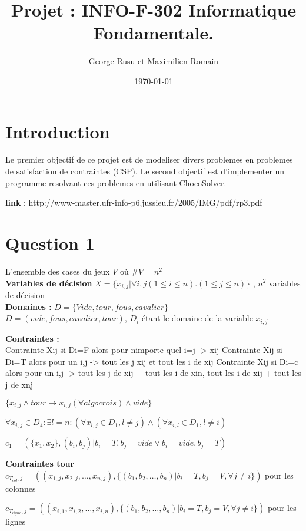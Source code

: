 \documentclass[a4paper,10pt]{article}
\title{Projet : INFO-F-302 Informatique Fondamentale.}
\author{George Rusu et Maximilien Romain}
\date{\today}
\begin{document}
\maketitle
\tableofcontents
\newpage
\section{Introduction}
Le premier objectif de ce projet est de modeliser divers problemes en problemes de satisfaction de contraintes (CSP). Le second objectif est d’implementer un programme resolvant ces problemes en utilisant ChocoSolver.

\textbf{link} :  http://www-master.ufr-info-p6.jussieu.fr/2005/IMG/pdf/rp3.pdf

\section{Question 1}
L'ensemble des cases du jeux $V$ où $ \#V = n^2$ \\
\textbf {Variables de décision} $ X = \{x_{i,j} | \forall i,j (1 \leq i \leq n).(1 \leq j \leq n)\}$ , $n^2$ variables de décision \\
\textbf{Domaines : }
$ D = \{Vide, tour, fous, cavalier \} $ \\
$ D = (vide, fous, cavalier, tour) $, $D_i$ étant le domaine de la variable $x_{i,j}$

\textbf{Contraintes : }\\
Contrainte{ Xij si Di=F alors {pour nimporte quel i=j -> xij}}
Contrainte{ Xij si Di=T alors {pour un i,j -> tout les j xij et tout les i de xij}}
Contrainte{ Xij si Di=c alors {pour un i,j -> tout les j de xij + tout les i de xin, tout les i de xij + tout les j de xnj}}

$ \{ x_{i,j} \wedge tour \rightarrow x_{i,j} (\forall algo crois) \wedge vide \} $

$\forall x_{i,j} \in D_4 : \exists l=n : (\forall x_{l,j} \in D_1, l \neq j) \wedge (\forall x_{i,l} \in D_1, l \neq i)$

$ c_1 = (\{x_1, x_2\},(b_i, b_j)| b_i = T, b_j = vide \lor b_i = vide, b_j = T) $

\textbf{Contraintes tour}\\
$ c_{T_{col},j} = ((x_{1,j}, x_{2,j},\ldots, x_{n,j}), \{(b_1, b_2,\ldots, b_n) | b_i = T, b_j = V, \forall j \ne i\})$ pour les colonnes

$ c_{T_{ligne},j} = ((x_{i,1}, x_{i,2},\ldots, x_{i,n}), \{(b_1, b_2,\ldots, b_n) | b_i = T, b_j = V, \forall j \ne i\})$ pour les lignes
\end{document}
